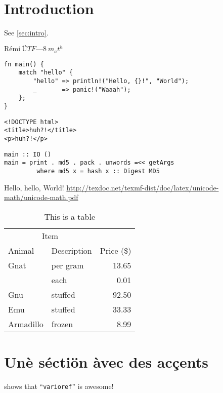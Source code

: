 \documentclass[12pt,a4paper]{article}
\author{Rémi \textsc{Nicole}}
\title{}
\newcommand{\includeplantuml}[1]{
	\resizebox{\textwidth}{!}{\texttt{}}
}
\begin{document}
\maketitle


\tableofcontents

\listoftodos

\section{Introduction}\label{sec:intro}


See \vref{sec:intro}.


$\text{Rémi}~ÜTF—8~m_a t^h$

\begin{verbatim}
fn main() {
	match "hello" {
		"hello" => println!("Hello, {}!", "World");
		_       => panic!("Waaah");
	};
}
\end{verbatim}

\begin{verbatim}
<!DOCTYPE html>
<title>huh?!</title>
<p>huh?!</p>
\end{verbatim}

\begin{verbatim}
main :: IO ()
main = print . md5 . pack . unwords =<< getArgs
         where md5 x = hash x :: Digest MD5
\end{verbatim}

Hello, hello, World! \url{http://texdoc.net/texmf-dist/doc/latex/unicode-math/unicode-math.pdf}

\begin{table}
	\centering
	\begin{tabular}{llr}
		\toprule
		\multicolumn{2}{c}{Item} \\
		\cmidrule(r){1-2}
		Animal    & Description & Price (\$) \\
		\midrule
		Gnat      & per gram    & 13.65      \\
		          &    each     & 0.01       \\
		Gnu       & stuffed     & 92.50      \\
		Emu       & stuffed     & 33.33      \\
		Armadillo & frozen      & 8.99       \\
		\bottomrule
	\end{tabular}\label{tab:mytable}
	\caption{This is a table}
\end{table}

\section{Unè séctiön àvec des acçents}

\newpage

 shows that \enquote{\texttt{varioref}} is awesome!

\listoflistings%
\listoffigures
\listoftables

\nocite{*}

\printbibliography%
\end{document}
